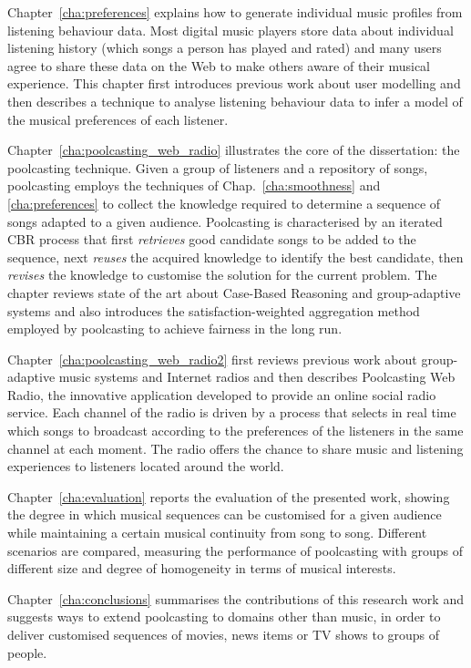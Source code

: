 Chapter~\ref{cha:preferences} explains how to generate individual music profiles from listening behaviour data. 
Most digital music players store data about individual listening history (which songs a person has played and rated) and many users agree to share these data on the Web to make others aware of their musical experience.
This chapter first introduces previous work about user modelling and then describes a technique to analyse listening behaviour data to infer a model of the musical preferences of each listener.

Chapter~\ref{cha:poolcasting_web_radio} illustrates the core of the dissertation: the poolcasting technique.
Given a group of listeners and a repository of songs, poolcasting employs the techniques of Chap.~\ref{cha:smoothness} and \ref{cha:preferences} to collect the knowledge required to determine a sequence of songs adapted to a given audience.
Poolcasting is characterised by an iterated CBR process that first  \emph{retrieves} good candidate songs to be added to the sequence, next \emph{reuses} the acquired knowledge to identify the best candidate, then \emph{revises} the knowledge to customise the solution for the current problem. 
The chapter reviews state of the art about Case-Based Reasoning and group-adaptive systems and also introduces the satisfaction-weighted aggregation method employed by poolcasting to achieve fairness in the long run. %

Chapter~\ref{cha:poolcasting_web_radio2} first reviews previous work about group-adaptive music systems and Internet radios and then describes Poolcasting Web Radio, the innovative application developed to provide an online social radio service.
Each channel of the radio is driven by a process that selects in real time which songs to broadcast according to the preferences of the listeners in the same channel at each moment. The radio offers the chance to share music and listening experiences to listeners located around the world.

Chapter~\ref{cha:evaluation} reports the evaluation of the presented work, showing the degree in which musical sequences can be customised for a given audience while maintaining a certain musical continuity from song to song. Different scenarios are compared, measuring the performance of poolcasting with groups of different size and degree of homogeneity in terms of musical interests.

Chapter~\ref{cha:conclusions} summarises the contributions of this research work and suggests ways to extend poolcasting to domains other than music, in order to deliver customised sequences of movies, news items or TV shows to groups of people.




